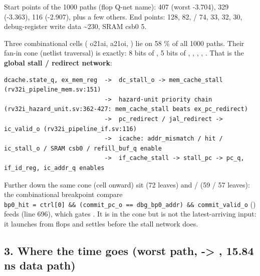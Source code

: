 \begin{record}

Start points of the 1000 paths (flop Q-net name):
 407 (worst -3.704),
 329 (-3.363),  116
(-2.907), plus a few others. End points: 
128,  82,
/ 74,  33,
 32,  30, debug-register write
data  \textasciitilde230, SRAM csb0 5.

Three combinational cells ( o21ai,  a21oi,
) lie on 58 \% of all 1000 paths. Their fan-in cone
(netlist traversal) is exactly: 8 bits of , 5 bits of
, ,
, ,
. That is the \textbf{global stall / redirect
network}:

\begin{lstlisting}[language={}]
dcache.state_q, ex_mem_reg  ->  dc_stall_o -> mem_cache_stall (rv32i_pipeline_mem.sv:151)
                            ->  hazard-unit priority chain (rv32i_hazard_unit.sv:362-427: mem_cache_stall beats ex_pc_redirect)
                            ->  pc_redirect / jal_redirect -> ic_valid_o (rv32i_pipeline_if.sv:116)
                            ->  icache: addr_mismatch / hit / ic_stall_o / SRAM csb0 / refill_buf_q enable
                            ->  if_cache_stall -> stall_pc -> pc_q, if_id_reg, ic_addr_q enables
\end{lstlisting}

Further down the same cone (cell  onward) sit
 (72 leaves) and  /
 (59 / 57 leaves): the combinational breakpoint
compare
\texttt{bp0\_\allowbreak{}hit\ =\allowbreak{}\ ctrl[0]\ \&\&\ (commit\_\allowbreak{}pc\_\allowbreak{}o\ =\allowbreak{}=\allowbreak{}\ dbg\_\allowbreak{}bp0\_\allowbreak{}addr)\ \&\&\ commit\_\allowbreak{}valid\_\allowbreak{}o}
() feeds  (line 696),
which gates . It is in the cone but is not the
latest-arriving input: it launches from flops and settles before the
stall network does.

\end{record}

\subsection{\texorpdfstring{3. Where the time goes (worst path,
 -\textgreater{}
, 15.84 ns data
path)}{3. Where the time goes (worst path,  -\textgreater{} , 15.84 ns data path)}}\label{cr:defect:sky130-cpu-ss-setup-r51p:3-where-the-time-goes-worst-path-u-dcachestate-q3-u-icacheu-tag-sramcsb0-1584-ns-data-path}

